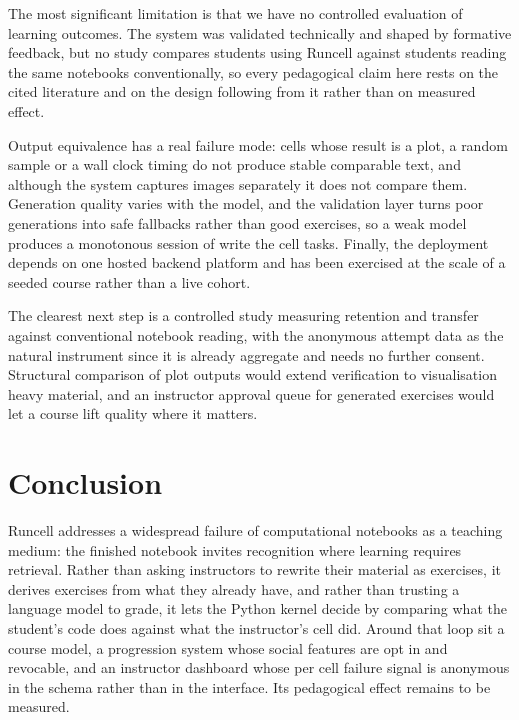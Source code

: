 \documentclass[manuscript]{acmart}
\begin{document}
The most significant limitation is that we have no controlled evaluation of
learning outcomes. The system was validated technically and shaped by formative
feedback, but no study compares students using Runcell against students reading
the same notebooks conventionally, so every pedagogical claim here rests on the
cited literature and on the design following from it rather than on measured
effect.

Output equivalence has a real failure mode: cells whose result is a plot, a
random sample or a wall clock timing do not produce stable comparable text, and
although the system captures images separately it does not compare them.
Generation quality varies with the model, and the validation layer turns poor
generations into safe fallbacks rather than good exercises, so a weak model
produces a monotonous session of write the cell tasks. Finally, the deployment
depends on one hosted backend platform and has been exercised at the scale of a
seeded course rather than a live cohort.

The clearest next step is a controlled study measuring retention and transfer
against conventional notebook reading, with the anonymous attempt data as the
natural instrument since it is already aggregate and needs no further consent.
Structural comparison of plot outputs would extend verification to
visualisation heavy material, and an instructor approval queue for generated
exercises would let a course lift quality where it matters.

\section{Conclusion}

Runcell addresses a widespread failure of computational notebooks as a teaching
medium: the finished notebook invites recognition where learning requires
retrieval. Rather than asking instructors to rewrite their material as
exercises, it derives exercises from what they already have, and rather than
trusting a language model to grade, it lets the Python kernel decide by
comparing what the student's code does against what the instructor's cell did.
Around that loop sit a course model, a progression system whose social features
are opt in and revocable, and an instructor dashboard whose per cell failure
signal is anonymous in the schema rather than in the interface. Its pedagogical
effect remains to be measured.
\end{document}
